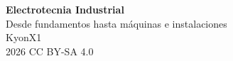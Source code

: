 \documentclass[11pt,a4paper,twoside,openright]{book}
\begin{document}
\frontmatter
\thispagestyle{empty}
\begin{center}
\vspace*{3cm}
{\Huge \bfseries Electrotecnia Industrial}\\[1cm]
{\Large Desde fundamentos hasta máquinas e instalaciones}\\[2cm]
{\large KyonX1}\\[0.5cm]
{\large 2026}
\vfill
{\small CC BY-SA 4.0}
\end{center}
\clearpage

\tableofcontents
\clearpage

\listoffigures
\listoftables
\clearpage

\mainmatter


\backmatter
\printbibliography[heading=bibintoc]
\end{document}
